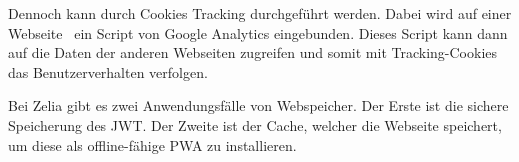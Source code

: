 Dennoch kann durch Cookies Tracking durchgeführt werden.
Dabei wird auf einer Webseite \zb\ ein Script von Google Analytics eingebunden. Dieses Script kann dann auf die Daten der anderen Webseiten zugreifen und somit mit Tracking-Cookies das Benutzerverhalten verfolgen.









Bei Zelia gibt es zwei Anwendungsfälle von Webspeicher. Der Erste ist die sichere Speicherung des JWT. Der Zweite ist der Cache, welcher die Webseite speichert, um diese als offline-fähige PWA zu installieren.

